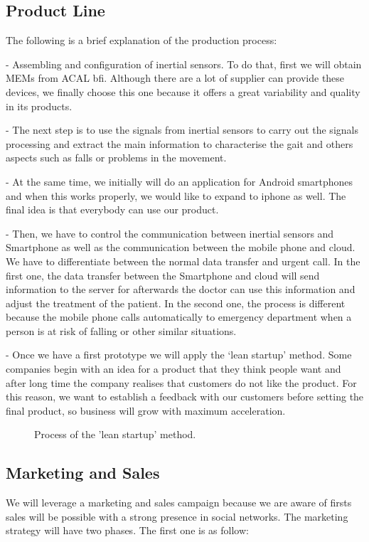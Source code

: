 \subsection{Product Line}
The following is a brief explanation of the production process:

-	Assembling and configuration of inertial sensors. To do that, first we will obtain MEMs from ACAL bfi. Although there are a lot of supplier can provide these devices, we finally choose this one because it offers a great variability and quality in its products.

-	The next step is to use the signals from inertial sensors to carry out the signals processing and extract the main information to characterise the gait and others aspects such as falls or problems in the movement.

-	At the same time, we initially will do an application for Android smartphones and when this works properly, we would like to expand to iphone as well. The final idea is that everybody can use our product.

-	Then, we have to control the communication between inertial sensors and Smartphone as well as the communication between the mobile phone and cloud. We have to differentiate between the normal data transfer and urgent call. In the first one, the data transfer between the Smartphone and cloud will send information to the server for afterwards the doctor can use this information and adjust the treatment of the patient. In the second one, the process is different because the mobile phone calls automatically to emergency department when a person is at risk of falling or other similar situations.

-	Once we have a first prototype we will apply the ‘lean startup’ method. Some companies begin with an idea for a product that they think people want and after long time the company realises that customers do not like the product. For this reason, we want to establish a feedback with our customers before setting the final product, so business will grow with maximum acceleration.

\begin{figure}[H]
	\centering
	\caption{Process of the 'lean startup' method.}
	\label{fig:leanstartup_diagram}
\end{figure}

\subsection{Marketing and Sales}
We will leverage a marketing and sales campaign because we are aware of firsts sales will be possible with a strong presence in social networks. The marketing strategy will have two phases. The first one is as follow:

